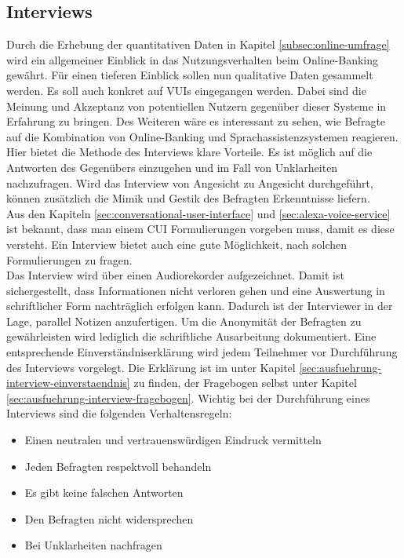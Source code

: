 \subsection{Interviews}
\label{subsec:interviews}
Durch die Erhebung der quantitativen Daten in Kapitel \ref{subsec:online-umfrage} wird ein allgemeiner Einblick in das Nutzungsverhalten beim Online-Banking gewährt. Für einen tieferen Einblick  sollen nun qualitative Daten gesammelt werden. Es soll auch konkret auf \acp{VUI} eingegangen werden. Dabei sind die Meinung und Akzeptanz von potentiellen Nutzern gegenüber dieser Systeme in Erfahrung zu bringen. Des Weiteren wäre es interessant zu sehen, wie Befragte auf die Kombination von Online-Banking und Sprachassistenzsystemen reagieren. Hier bietet die Methode des Interviews klare Vorteile. Es ist möglich auf die Antworten des Gegenübers einzugehen und im Fall von Unklarheiten nachzufragen. Wird das Interview von Angesicht zu Angesicht durchgeführt, können zusätzlich die Mimik und Gestik des Befragten Erkenntnisse liefern.\\
Aus den Kapiteln \ref{sec:conversational-user-interface} und \ref{sec:alexa-voice-service} ist bekannt, dass man einem \ac{CUI} Formulierungen vorgeben muss, damit es diese versteht. Ein Interview bietet auch eine gute Möglichkeit, nach solchen Formulierungen zu fragen.\\
Das Interview wird über einen Audiorekorder aufgezeichnet. Damit ist sichergestellt, dass Informationen nicht verloren gehen und eine Auswertung in schriftlicher Form nachträglich erfolgen kann. Dadurch ist der Interviewer in der Lage, parallel Notizen anzufertigen. Um die Anonymität der Befragten zu gewährleisten wird lediglich die schriftliche Ausarbeitung dokumentiert. Eine entsprechende Einverständniserklärung wird jedem Teilnehmer vor Durchführung des Interviews vorgelegt. Die Erklärung ist im  unter Kapitel \ref{sec:ausfuehrung-interview-einverstaendnis} zu finden, der Fragebogen selbst unter Kapitel \ref{sec:ausfuehrung-interview-fragebogen}. Wichtig bei der Durchführung eines Interviews sind die folgenden Verhaltensregeln: 

\begin{itemize}
    \item Einen neutralen und vertrauenswürdigen Eindruck vermitteln
    \item Jeden Befragten respektvoll behandeln
    \item Es gibt keine falschen Antworten
    \item Den Befragten nicht widersprechen
    \item Bei Unklarheiten nachfragen
\end{itemize}

